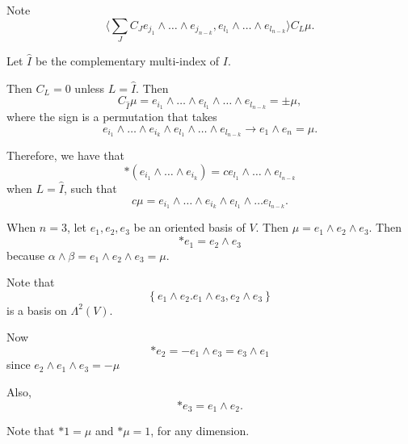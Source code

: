 \documentclass[notoc,notitlepage]{tufte-book}
\begin{document}
Note 
\begin{equation*}
  \langle \sum_{J} C_J e_{j_1} \land \hdots \land e_{j_{n-k}}, e_{l_1} \land
  \hdots \land e_{l_{n-k}} \rangle C_L \mu.
\end{equation*}

Let $\hat{I}$ be the complementary multi-index of $I$.

Then $C_L = 0$ unless $L = \hat{I}$. Then
\begin{equation*}
  C_{\hat{I}} \mu = e_{i_1} \land \hdots \land e_{l_1} \land \hdots \land
  e_{l_{n-k}} = \pm \mu,
\end{equation*}
where the sign is a permutation that takes
\begin{equation*}
  e_{i_1} \land \hdots \land e_{i_k} \land e_{l_1} \land \hdots \land
  e_{l_{n-k}} \to e_1 \land e_n = \mu.
\end{equation*}

Therefore, we have that
\begin{equation*}
  *(e_{i_1} \land \hdots \land e_{i_k}) = c e_{l_1} \land \hdots \land
  e_{l_{n-k}}
\end{equation*}
when $L = \hat{I}$, such that
\begin{equation*}\label{eq:}
  c \mu = e_{i_1} \land \hdots \land e_{i_k} \land e_{l_1} \land \hdots
  e_{l_{n-k}}.
\end{equation*}

\begin{eg}
  When $n = 3$, let $e_1, e_2, e_3$ be an oriented basis of $V$. Then $\mu = e_1
  \land e_2 \land e_3$. Then
  \begin{equation*}
    * e_1 = e_2 \land e_3
  \end{equation*}
  because $\alpha \land \beta = e_1 \land e_2 \land e_3 = \mu$.

  Note that
  \begin{equation*}
    \left\{ e_1 \land e_2. e_1 \land e_3, e_2 \land e_3 \right\}
  \end{equation*}
  is a basis on $\Lambda^2(V)$.

  Now
  \begin{equation*}
    * e_2 = - e_1 \land e_3 = e_3 \land e_1
  \end{equation*}
  since $e_2 \land e_1 \land e_3 = - \mu$

  Also,
  \begin{equation*}
    * e_3 = e_1 \land e_2.
  \end{equation*}

  Note that $* 1 = \mu$ and  $* \mu = 1$, for any dimension.
\end{eg}
\end{document}
